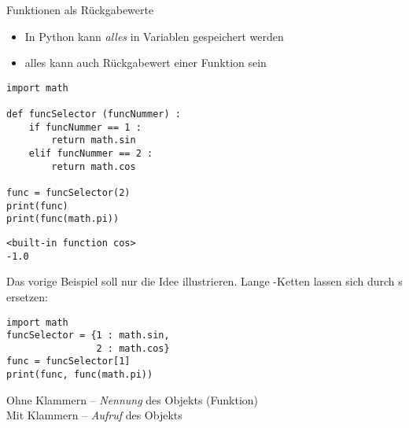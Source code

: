 \begin{frame}[fragile]{Funktionen als Rückgabewerte}
%
\begin{itemize}
\item In Python kann \emph{alles} in Variablen gespeichert werden
\item[\Thus] alles kann auch Rückgabewert einer Funktion sein
\end{itemize}
%
\begin{tcbraster}[raster columns=2,
                  raster equal height,
                  nobeforeafter,
                  raster column skip=0.5cm]
\begin{codebox}
\begin{verbatim}
import math

def funcSelector (funcNummer) :
    if funcNummer == 1 :
        return math.sin
    elif funcNummer == 2 :
        return math.cos

func = funcSelector(2)
print(func)
print(func(math.pi))
\end{verbatim}
\end{codebox}
%
\begin{cmdbox}
\begin{verbatim}
<built-in function cos>
-1.0
\end{verbatim}
\end{cmdbox}
\end{tcbraster}
%
\end{frame}



\begin{frame}[fragile]
%
\begin{hintbox}
\scriptsize
Das vorige Beispiel soll nur die Idee illustrieren. Lange -Ketten lassen sich durch s ersetzen:

\begin{codebox}
\begin{verbatim}
import math
funcSelector = {1 : math.sin,
                2 : math.cos}
func = funcSelector[1]
print(func, func(math.pi))
\end{verbatim}
\end{codebox}
\end{hintbox}
%
\begin{hintbox}
Ohne Klammern -- \emph{Nennung} des Objekts (Funktion)\\
Mit Klammern -- \emph{Aufruf} des Objekts
\end{hintbox}
%
\end{frame}

